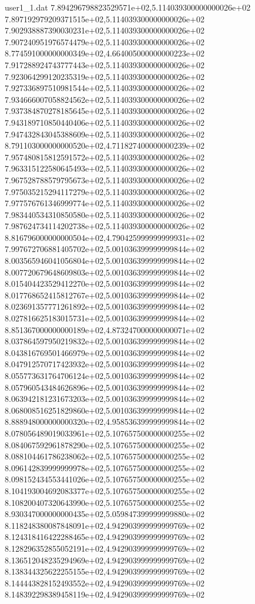 \begin{filecontents}{user1_1.dat}
7.894296798823529571e+02,5.114039300000000026e+02
7.897192979209371515e+02,5.114039300000000026e+02
7.902938887390030231e+02,5.114039300000000026e+02
7.907240951976574479e+02,5.114039300000000026e+02
8.774591000000000349e+02,4.664005000000000223e+02
7.917288924743777443e+02,5.114039300000000026e+02
7.923064299120235319e+02,5.114039300000000026e+02
7.927336897510981544e+02,5.114039300000000026e+02
7.934666007058824562e+02,5.114039300000000026e+02
7.937384870278185645e+02,5.114039300000000026e+02
7.943189710850440406e+02,5.114039300000000026e+02
7.947432843045388609e+02,5.114039300000000026e+02
8.791103000000000520e+02,4.711827400000000239e+02
7.957480815812591572e+02,5.114039300000000026e+02
7.963315122580645493e+02,5.114039300000000026e+02
7.967528788579795673e+02,5.114039300000000026e+02
7.975035215294117279e+02,5.114039300000000026e+02
7.977576761346999774e+02,5.114039300000000026e+02
7.983440534310850580e+02,5.114039300000000026e+02
7.987624734114202738e+02,5.114039300000000026e+02
8.816796000000000504e+02,4.790425999999999931e+02
7.997672706881405702e+02,5.001036399999999844e+02
8.003565946041056804e+02,5.001036399999999844e+02
8.007720679648609803e+02,5.001036399999999844e+02
8.015404423529412270e+02,5.001036399999999844e+02
8.017768652415812767e+02,5.001036399999999844e+02
8.023691357771261892e+02,5.001036399999999844e+02
8.027816625183015731e+02,5.001036399999999844e+02
8.851367000000000189e+02,4.873247000000000071e+02
8.037864597950219832e+02,5.001036399999999844e+02
8.043816769501466979e+02,5.001036399999999844e+02
8.047912570717423932e+02,5.001036399999999844e+02
8.055773631764706124e+02,5.001036399999999844e+02
8.057960543484626896e+02,5.001036399999999844e+02
8.063942181231673203e+02,5.001036399999999844e+02
8.068008516251829860e+02,5.001036399999999844e+02
8.888948000000000320e+02,4.958536399999999844e+02
8.078056489019033961e+02,5.107657500000000255e+02
8.084067592961878290e+02,5.107657500000000255e+02
8.088104461786238062e+02,5.107657500000000255e+02
8.096142839999999978e+02,5.107657500000000255e+02
8.098152434553441026e+02,5.107657500000000255e+02
8.104193004692083377e+02,5.107657500000000255e+02
8.108200407320643990e+02,5.107657500000000255e+02
8.930347000000000435e+02,5.059847399999999880e+02
8.118248380087848091e+02,4.942903999999999769e+02
8.124318416422288465e+02,4.942903999999999769e+02
8.128296352855052191e+02,4.942903999999999769e+02
8.136512048235294969e+02,4.942903999999999769e+02
8.138344325622255155e+02,4.942903999999999769e+02
8.144443828152493552e+02,4.942903999999999769e+02
8.148392298389458119e+02,4.942903999999999769e+02

\end{filecontents}
